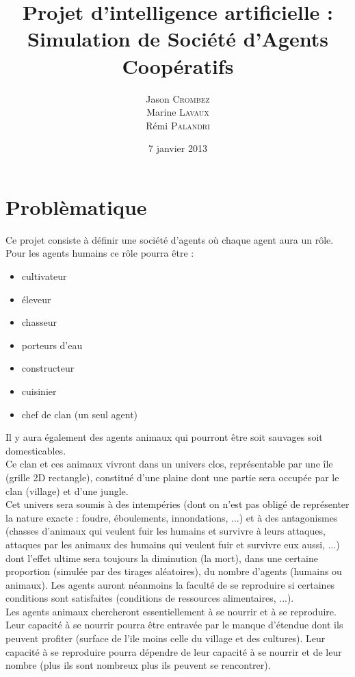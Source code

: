 \documentclass[12pt]{article}
\date{7 janvier 2013}
\title{Projet d'intelligence artificielle :\\Simulation de Société d'Agents Coopératifs}
\author{Jason \textsc{Crombez} \\ Marine \textsc{Lavaux} \\ Rémi \textsc{Palandri}}
\begin{document}
	
\maketitle

\newpage
	
\section{Problèmatique}
	
Ce projet consiste à définir une société d'agents où chaque agent aura un rôle. Pour les agents humains
ce rôle pourra être :\\

	\begin{itemize}

	\item cultivateur
    	\item éleveur
    	\item chasseur
    	\item porteurs d'eau
    	\item constructeur
    	\item cuisinier
    	\item chef de clan (un seul agent)\\

	\end{itemize}

Il y aura également des agents animaux qui pourront être soit sauvages soit domesticables.\\

Ce clan et ces animaux vivront dans un univers clos, représentable par une île (grille 2D rectangle), constitué d'une plaine dont une partie sera occupée par le clan (village) et d'une jungle.\\

Cet univers sera soumis à des intempéries (dont on n'est pas obligé de représenter la nature exacte : foudre, éboulements, innondations, ...) et à des antagonismes (chasses d'animaux qui veulent fuir les humains et survivre à leurs attaques, attaques par les animaux des humains qui veulent fuir et survivre eux aussi, ...) dont l'effet ultime sera toujours la diminution (la mort), dans une certaine proportion (simulée par des tirages aléatoires), du nombre d'agents (humains ou animaux). Les agents auront néanmoins la faculté de se reproduire si certaines conditions sont satisfaites (conditions de ressources alimentaires, ...).\\

Les agents animaux chercheront essentiellement à se nourrir et à se reproduire. Leur capacité à se nourrir pourra être entravée par le manque d'étendue dont ils peuvent profiter (surface de l'ile moins celle du village et des cultures). Leur capacité à se reproduire pourra dépendre de leur capacité à se nourrir et de leur nombre (plus ils sont nombreux plus ils peuvent se rencontrer).\\
\end{document}
